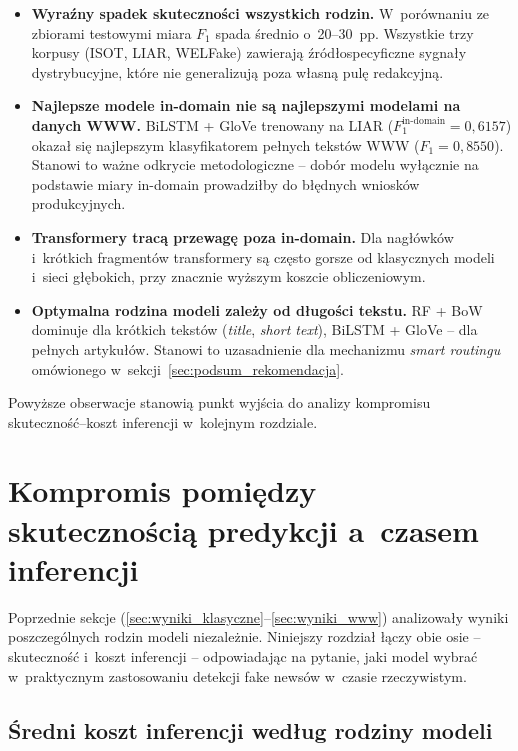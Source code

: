 \documentclass[oneside,polski,logo]{amuthesis}
\begin{document}
\begin{itemize}
  \item \textbf{Wyraźny spadek skuteczności wszystkich rodzin.}
        W~porównaniu ze zbiorami testowymi miara $F_1$ spada
        średnio o~20--30~pp. Wszystkie trzy korpusy (ISOT, LIAR,
        WELFake) zawierają źródłospecyficzne sygnały dystrybucyjne,
        które nie generalizują poza własną pulę redakcyjną.
  \item \textbf{Najlepsze modele in-domain nie są najlepszymi
        modelami na danych WWW.} BiLSTM + GloVe trenowany na LIAR
        (\(F_1^{\text{in-domain}} = 0{,}6157\)) okazał się
        najlepszym klasyfikatorem pełnych tekstów WWW
        (\(F_1 = 0{,}8550\)). Stanowi to ważne odkrycie
        metodologiczne -- dobór modelu wyłącznie na podstawie
        miary in-domain prowadziłby do błędnych wniosków produkcyjnych.
  \item \textbf{Transformery tracą przewagę poza in-domain.}
        Dla nagłówków i~krótkich fragmentów transformery są często
        gorsze od klasycznych modeli i~sieci głębokich, przy
        znacznie wyższym koszcie obliczeniowym.
  \item \textbf{Optymalna rodzina modeli zależy od długości tekstu.}
        RF + BoW dominuje dla krótkich tekstów (\textit{title},
        \textit{short text}), BiLSTM + GloVe -- dla pełnych artykułów.
        Stanowi to uzasadnienie dla mechanizmu \textit{smart routingu}
        omówionego w~sekcji~\ref{sec:podsum_rekomendacja}.
\end{itemize}

Powyższe obserwacje stanowią punkt wyjścia do analizy kompromisu
skuteczność--koszt inferencji w~kolejnym rozdziale.

\section{Kompromis pomiędzy skutecznością predykcji a~czasem inferencji}
\label{sec:wyniki_kompromis}

Poprzednie sekcje (\ref{sec:wyniki_klasyczne}--\ref{sec:wyniki_www})
analizowały wyniki poszczególnych rodzin modeli niezależnie.
Niniejszy rozdział łączy obie osie -- skuteczność i~koszt inferencji
-- odpowiadając na pytanie, jaki model wybrać w~praktycznym zastosowaniu
detekcji fake newsów w~czasie rzeczywistym.

\subsection{Średni koszt inferencji według rodziny modeli}
\label{sec:kompromis_srednie}
\end{document}
